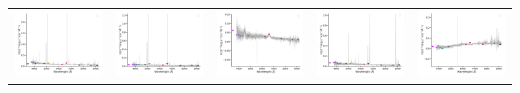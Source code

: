 \begin{center}
\begin{longtable}{l l l l l }
    \includegraphics[width=0.19\linewidth, clip]{Figs/Figs-sdss/spec-0530-52026-0013-SPLUS-n02n44-027436.pdf} & \includegraphics[width=0.19\linewidth, clip]{Figs/Figs-sdss/spec-0572-52289-0114-SPLUS-n04n01-004018.pdf} & \includegraphics[width=0.19\linewidth, clip]{Figs/Figs-sdss/spec-0573-52325-0471-SPLUS-n04n01-030147.pdf} & \includegraphics[width=0.19\linewidth, clip]{Figs/Figs-sdss/spec-0584-52049-0618-SPLUS-n05n50-017121.pdf} & \includegraphics[width=0.19\linewidth, clip]{Figs/Figs-sdss/spec-0669-52559-0359-STRIPE82-0004-022337.pdf} \\

\end{longtable}
\end{center}
